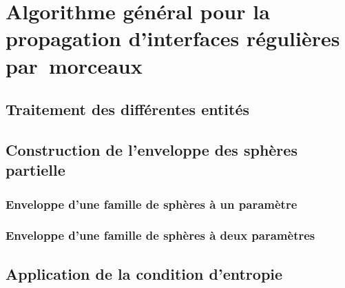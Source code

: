 \chapter[Algorithme de propagation d'interfaces régulières par~morceaux]{Algorithme général pour la propagation d'interfaces régulières par~morceaux}
\label{chap:algo_general}

\section{Traitement des différentes entités \brep}


\section{Construction de l'enveloppe des sphères partielle}
\subsection{Enveloppe d'une famille de sphères à un paramètre}
\subsection{Enveloppe d'une famille de sphères à deux paramètres}

\section{Application de la condition d'entropie}%

